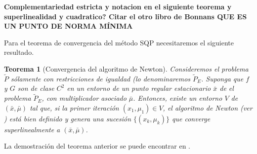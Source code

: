\documentclass[a4paper,10pt]{book}
\newcommand{\bx}{\bar{x}}
\newcommand{\bmu}{\bar{\mu}}
\newtheorem{teo}{Teorema}[section]
\begin{document}
\textbf{Complementariedad estricta y notacion en el siguiente teorema y superlinealidad y cuadratico?  Citar el otro libro de Bonnans QUE ES UN PUNTO DE NORMA MÍNIMA}


Para el teorema de convergencia del método SQP necesitaremos el siguiente resultado.

\begin{teo}[Convergencia del algoritmo de Newton]\label{convernewton}
Consideremos el problema $\tilde{P}$ sólamente con restricciones de igualdad (lo denominaremos $\tilde{P}_E$. Suponga que $f$ y $G$ son de clase $C^2$ en un entorno de un punto regular estacionario $\bx$ de el problema $\tilde{P}_E$, con multiplicador asociado $\bmu$. Entonces, existe un entorno $V$ de $(\bx,\bmu)$ tal que, si la primer iteración $(x_1,\mu_1)\in V$, el algoritmo de Newton (ver \cite[Section 14.1]{bonnans2006numerical}) está bien definido y genera una sucesión $\{(x_k,\mu_k)\}$ que converge superlinealmente a $(\bx,\bmu)$.
\end{teo}

La demostración del teorema anterior se puede encontrar en \cite[Therorem 14.4]{bonnans2006numerical}.
\end{document}
